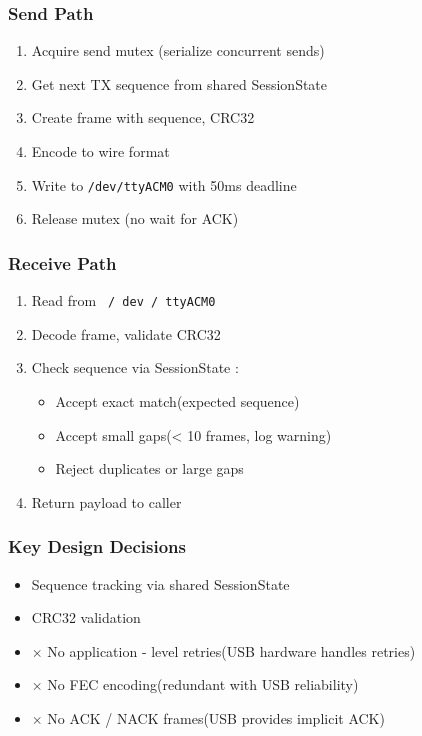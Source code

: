 \subsubsection{Send Path
}

\begin{enumerate}
\item Acquire send mutex (serialize concurrent sends)
\item Get next TX sequence from shared SessionState
\item Create frame with sequence, CRC32
\item Encode to wire format
\item Write to \texttt{/dev/ttyACM0} with 50ms deadline
\item Release mutex (no wait for ACK)
\end{enumerate}

\subsubsection{Receive Path}

\begin{enumerate}
\item Read from \texttt { / dev / ttyACM0}
\item Decode frame, validate CRC32
\item Check sequence via SessionState :
  \begin{itemize}
\item Accept exact match(expected sequence)
  \item Accept small gaps(< 10 frames, log warning)
  \item Reject duplicates or large gaps
  \end{itemize}
\item Return payload to caller
\end{enumerate}

\subsubsection{Key Design Decisions}

\begin{itemize}
\item \checkmark {}
Sequence tracking via shared SessionState
\item \checkmark {}
CRC32 validation
\item $\times$ No application - level retries(USB hardware handles retries)
\item $\times$ No FEC encoding(redundant with USB reliability)
\item $\times$ No ACK / NACK frames(USB provides implicit ACK)
\end{itemize}

